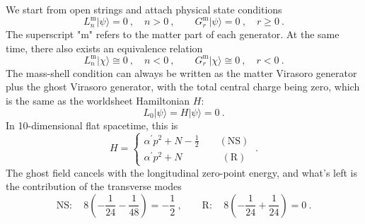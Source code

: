 	We start from open strings and attach physical state conditions
	\begin{equation}
		L_{n}^{\mathrm{m}}\lvert \psi \rangle=0 \:, \quad n >0 \:,\qquad
		G_{r}^{\mathrm{m}}\lvert\psi \rangle =0\:, \quad r\geq 0 \:. \label{10.5.1}
	\end{equation}
	The superscript "m" refers to the matter part of each generator. At the same time, there also exists an equivalence relation
	\begin{equation}
		L_{n}^{\mathrm{m}}\lvert \chi \rangle \cong 0 \:, \quad n<0 \:,\qquad
		G_{r}^{\mathrm{m}}\lvert\chi \rangle \cong 0\:, \quad r< 0 \:. \label{10.5.2}
	\end{equation}
	The mass-shell condition can always be written as the matter Virasoro generator plus the ghost Virasoro generator, with the total central charge being zero, which is the same as the worldsheet Hamiltonian $H$:
	\begin{equation}
		L_{0}\lvert\psi\rangle = H\lvert\psi\rangle =0\:. \label{10.5.3}
	\end{equation}
	In 10-dimensional flat spacetime, this is
	\begin{equation}
		H= \left\{
		\begin{array}{l}
			\alpha^{\prime}p^{2}+N-\frac{1}{2} \qquad (\text{NS})   \\
			\alpha^{\prime}p^{2}+N \qquad\qquad (\text{R})
		\end{array} \right. \:. \label{10.5.4}
	\end{equation}
	The ghost field cancels with the longitudinal zero-point energy, and what's left is the contribution of the transverse modes
	\begin{equation}
		\text{NS}:\quad 8\left(-\frac{1}{24}-\frac{1}{48}\right) = -\frac{1}{2} \:, \qquad
		\text{R}: \quad 8\left(-\frac{1}{24}+\frac{1}{24}\right) = 0 \:. \label{10.5.5}
	\end{equation}
	
